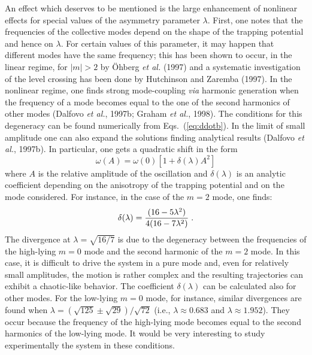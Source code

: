 An effect which deserves to be mentioned is the large enhancement
of nonlinear effects for special values of the asymmetry parameter
$\lambda$. First, one notes that the frequencies of the collective 
modes depend on the shape of the trapping potential and hence on 
$\lambda$. For certain values of this parameter, it may happen that 
different modes have the same frequency; this has been shown to occur,
in the linear regime,  for $|m|>2$ by \"Ohberg {\it et al.} (1997)
and a systematic investigation of the level crossing has been done
by Hutchinson and Zaremba (1997). In the 
nonlinear regime, one finds strong mode-coupling {\it via} harmonic
generation when the frequency of a mode becomes equal to the one
of the second harmonics of other modes (Dalfovo {\it et al.},
1997b; Graham {\it et al.}, 1998). The conditions for this degeneracy
can be found numerically from Eqs.~(\ref{eq:ddotb}). In the limit
of small amplitude one can also expand the solutions finding
analytical results (Dalfovo {\it et al.}, 1997b). In particular,
one gets a quadratic shift in the form
\begin{equation}
\omega (A) = \omega(0) [ 1 +\delta(\lambda) A^2 ]
\label{eq:quadraticshift}
\end{equation}
where $A$ is the relative amplitude of the oscillation and
$\delta(\lambda)$ is an analytic  coefficient depending on the
anisotropy of the trapping potential and on the mode considered.
For instance, in the case of the $m=2$ mode, one finds:
\begin{equation}
\delta (\lambda) = { (16 - 5 \lambda^2)
\over 4 (16 - 7 \lambda^2) } \; .
\label{eq:delta-2}
\end{equation}
The divergence at $\lambda=\sqrt{16/7}$  is due to the degeneracy
between the frequencies of the high-lying $m=0$ mode and the second
harmonic of the $m=2$ mode.  In this case, it is difficult to drive
the system in a pure mode and, even for relatively small amplitudes, the 
motion is rather complex and the resulting trajectories can exhibit
a chaotic-like behavior. The coefficient $\delta(\lambda)$ can be
calculated also for other modes. For the low-lying $m=0$ mode,
for instance, similar divergences are found when $\lambda= (\sqrt{125}
\pm \sqrt{29}) /\sqrt{72}$ (i.e., $\lambda \approx 0.683$ and
$\lambda \approx 1.952$). They occur because the frequency of the
high-lying mode becomes equal to the second harmonics of the low-lying
mode. It would be very interesting to study experimentally the system
in these conditions. 

